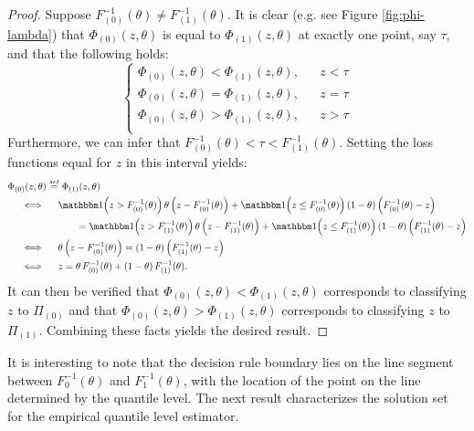 \begin{proof}
  Suppose $F_{(0)}^{-1}(\theta) \ne F_{(1)}^{-1}(\theta)$.  It is clear
  (e.g. see Figure \ref{fig:phi-lambda}) that $\Phi_{(0)}(z, \theta)$ is
  equal to $\Phi_{(1)}(z, \theta)$ at exactly one point, say $\tau$, and that
  the following holds:
  \begin{equation*}
    \left\{
      \begin{array}{lll}
        \Phi_{(0)}(z, \theta) < \Phi_{(1)}(z, \theta), & & z < \tau \\[1ex]
        \Phi_{(0)}(z, \theta) = \Phi_{(1)}(z, \theta), & & z = \tau \\[1ex]
        \Phi_{(0)}(z, \theta) > \Phi_{(1)}(z, \theta), & & z > \tau \\
      \end{array}
    \right.
  \end{equation*}
  Furthermore, we can infer that
  $F_{(0)}^{-1}(\theta) < \tau < F_{(1)}^{-1}(\theta)$.  Setting the loss
  functions equal for $z$ in this interval yields:
  \begin{align*}
    & \Phi_{(0)}(z, \theta) \stackrel{\mathit{set}}{=} \Phi_{(1)}(z, \theta) \\
    & \hspace{5mm} \Longleftrightarrow \hspace{5mm}
      \ind\!\! \left(z > F_{(0)}^{-1}(\theta)\right) \theta
      \left(z - F_{(0)}^{-1}(\theta)\right) +
      \ind\!\! \left(z \leq F_{(0)}^{-1}(\theta)\right) (1 - \theta)
      \left(F_{(0)}^{-1}(\theta) - z\right) \\
    & \hspace{25mm} =
      \ind\!\! \left(z > F_{(1)}^{-1}(\theta)\right) \theta
      \left(z - F_{(1)}^{-1}(\theta)\right) +
      \ind\!\! \left(z \leq F_{(1)}^{-1}(\theta)\right) (1 - \theta)
      \left(F_{(1)}^{-1}(\theta) - z\right) \\
    & \hspace{5mm} \Longleftrightarrow \hspace{5mm}
      \theta \left(z - F_{(0)}^{-1}(\theta)\right) =
      (1 - \theta) \left(F_{(1)}^{-1}(\theta) - z\right) \\
    & \hspace{5mm} \Longleftrightarrow \hspace{5mm}
      z = \theta\, F_{(0)}^{-1}(\theta) + (1 - \theta)\, F_{(1)}^{-1}(\theta).
  \end{align*}
  It can then be verified that $\Phi_{(0)}(z, \theta) < \Phi_{(1)}(z, \theta)$
  corresponds to classifying $z$ to $\Pi_{(0)}$ and that
  $\Phi_{(0)}(z, \theta) > \Phi_{(1)}(z, \theta)$ corresponds to classifying $z$
  to $\Pi_{(1)}$.  Combining these facts yields the desired result.
\end{proof}
It is interesting to note that the decision rule boundary lies on the line
segment between $F_0^{-1}(\theta)$ and $F_1^{-1}(\theta)$, with the location of
the point on the line determined by the quantile level.  The next result
characterizes the solution set for the empirical quantile level estimator.

